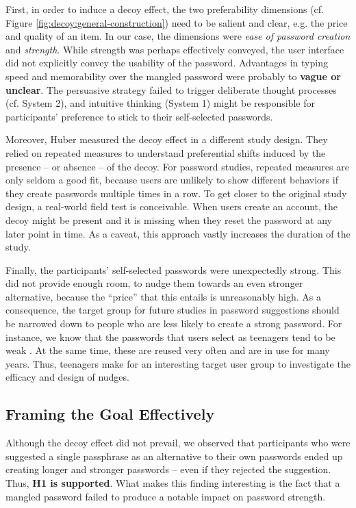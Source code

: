First, in order to induce a decoy effect, the two preferability dimensions (cf. Figure \ref{fig:decoy:general-construction}) need to be salient and clear, e.g. the price and quality of an item. In our case, the dimensions were \textit{ease of password creation} and \textit{strength}. While strength was perhaps effectively conveyed, the user interface did not explicitly convey the usability of the password. Advantages in typing speed and memorability over the mangled password were probably to \textbf{vague or unclear}. The persuasive strategy failed to trigger deliberate thought processes (cf. System 2), and intuitive thinking (System 1) might be responsible for participants' preference to stick to their self-selected passwords. 

Moreover, Huber \etal measured the decoy effect in a different study design. They relied on repeated measures to understand preferential shifts induced by the presence -- or absence -- of the decoy. For password studies, repeated measures are only seldom a good fit, because users are unlikely to show different behaviors if they create passwords multiple times in a row. To get closer to the original study design, a real-world field test is conceivable. When users create an account, the decoy might be present and it is missing when they reset the password at any later point in time. As a caveat, this approach vastly increases the duration of the study. 

Finally, the participants' self-selected passwords were unexpectedly strong. This did not provide enough room, to nudge them towards an even stronger alternative, because the ``price'' that this entails is unreasonably high. As a consequence, the target group for future studies in password suggestions should be narrowed down to people who are less likely to create a strong password. For instance, we know that the passwords that users select as teenagers tend to be weak \cite{VonZezschwitz2013SurvivalShortest}. At the same time, these are reused very often and are in use for many years. Thus, teenagers make for an interesting target user group to investigate the efficacy and design of nudges. 


\subsection{Framing the Goal Effectively}
Although the decoy effect did not prevail, we observed that participants who were suggested a single passphrase as an alternative to their own passwords ended up creating longer and stronger passwords -- even if they rejected the suggestion. Thus, \textbf{H1 is supported}. What makes this finding interesting is the fact that a mangled password failed to produce a notable impact on password strength. 

